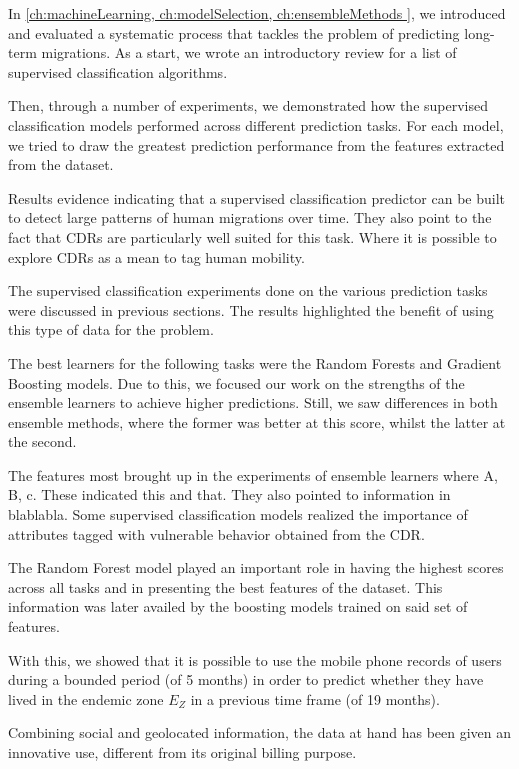 In \cref{ch:machineLearning, ch:modelSelection, ch:ensembleMethods }, we introduced and evaluated a systematic process that tackles the problem of predicting long-term migrations.
As a start, we wrote an introductory review for a list of supervised classification algorithms.

Then, through a number of experiments, we demonstrated how the supervised classification models performed across different prediction tasks.
For each model, we tried to draw the greatest prediction performance from the features extracted from the dataset.

Results evidence indicating that a supervised classification predictor can be built to detect large patterns of human migrations over time.
They also point to the fact that CDRs are particularly well suited for this task.
Where it is possible to explore CDRs as a mean to tag human mobility.


The supervised classification experiments done on the various prediction tasks were discussed in previous sections.
The results highlighted the benefit of using this type of data for the problem.


The best learners for the following tasks were the Random Forests and Gradient Boosting models.
Due to this, we focused our work on the strengths of the ensemble learners to achieve higher predictions.
Still, we saw differences in both ensemble methods, where the former was better at this score, whilst the latter at the second.


The features most brought up in the experiments of ensemble learners where A, B, c.
These indicated this and that.
They also pointed to information in  blablabla.
Some supervised classification models realized the importance of attributes tagged with vulnerable behavior obtained from the CDR.\@

The Random Forest model played an important role in having the highest scores across all tasks and in presenting the best features of the dataset.
This information was later availed by the boosting models trained on said set of features.



With this, we showed that it is possible to use the mobile phone records of users during a bounded period (of 5 months) in order to predict whether they have lived in the endemic zone $E_Z$ in a previous time frame (of 19 months).

Combining social and geolocated information, the data at hand has been given an innovative use, different from its original billing purpose.

